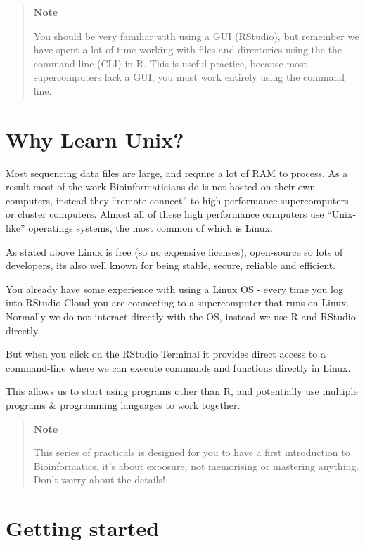 \documentclass[
]{book}
\begin{document}
\begin{quote}
\textbf{Note}

You should be very familiar with using a GUI (RStudio), but remember we have spent a lot of time working with files and directories using the the command line (CLI) in R. This is useful practice, because most supercomputers lack a GUI, you must work entirely using the command line.
\end{quote}

\hypertarget{why-learn-unix}{%
\section{Why Learn Unix?}\label{why-learn-unix}}

Most sequencing data files are large, and require a lot of RAM to process. As a result most of the work Bioinformaticians do is not hosted on their own computers, instead they ``remote-connect'' to high performance supercomputers or cluster computers. Almost all of these high performance computers use ``Unix-like'' operatings systems, the most common of which is Linux.

As stated above Linux is free (so no expensive licenses), open-source so lots of developers, its also well known for being stable, secure, reliable and efficient.

You already have some experience with using a Linux OS - every time you log into RStudio Cloud you are connecting to a supercomputer that runs on Linux. Normally we do not interact directly with the OS, instead we use R and RStudio directly.

But when you click on the RStudio Terminal it provides direct access to a command-line where we can execute commands and functions directly in Linux.

This allows us to start using programs other than R, and potentially use multiple programs \& programming languages to work together.

\begin{quote}
\textbf{Note}

This series of practicals is designed for you to have a first introduction to Bioinformatics, it's about exposure, not memorising or mastering anything. Don't worry about the details!
\end{quote}

\hypertarget{getting-started}{%
\section{Getting started}\label{getting-started}}
\end{document}
